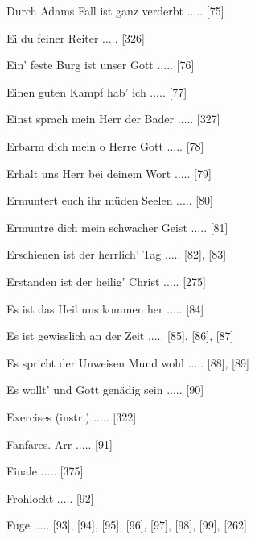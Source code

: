 \documentclass[twocolumn]{book}
\begin{document}
\newline 
Durch Adams Fall ist ganz verderbt ..... [75]

\newline 
Ei du feiner Reiter ..... [326]

\newline 
Ein' feste Burg ist unser Gott ..... [76]

\newline 
Einen guten Kampf hab' ich ..... [77]

\newline 
Einst sprach mein Herr der Bader ..... [327]

\newline 
Erbarm dich mein o Herre Gott ..... [78]

\newline 
Erhalt uns Herr bei deinem Wort ..... [79]

\newline 
Ermuntert euch ihr müden Seelen ..... [80]

\newline 
Ermuntre dich mein schwacher Geist ..... [81]

\newline 
Erschienen ist der herrlich' Tag ..... [82], [83]

\newline 
Erstanden ist der heilig' Christ ..... [275]

\newline 
Es ist das Heil uns kommen her ..... [84]

\newline 
Es ist gewisslich an der Zeit ..... [85], [86], [87]

\newline 
Es spricht der Unweisen Mund wohl ..... [88], [89]

\newline 
Es wollt' und Gott genädig sein ..... [90]

\newline 
Exercises (instr.) ..... [322]

\newline 
Fanfares. Arr ..... [91]

\newline 
Finale ..... [375]

\newline 
Frohlockt ..... [92]

\newline 
Fuge ..... [93], [94], [95], [96], [97], [98], [99], [262]
\end{document}

